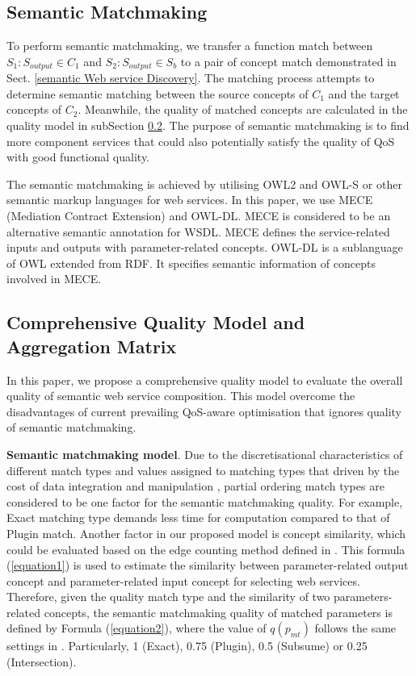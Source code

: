 \documentclass{llncs}
\begin{document}
\subsection{Semantic Matchmaking} \label{semantic_matchmaking}
To perform semantic matchmaking, we transfer a function match between $S_{1}: S_{output} \in C_{1}$ and $S_{2}:S_{output} \in S_{b}$ to a pair of concept match demonstrated in Sect. \ref{semantic Web service Discovery}. The matching process attempts to determine semantic matching between the source concepts of $C_{1}$ and the target concepts of $C_{2}$. Meanwhile, the quality of matched concepts are calculated in the quality model in subSection \ref{qualityModel}. The purpose of semantic matchmaking is to find more component services that could also potentially satisfy the quality of QoS with good functional quality.

The semantic matchmaking is achieved by utilising OWL2 and OWL-S or other semantic markup languages for web services. In this paper, we use MECE (Mediation Contract Extension) \cite{bleul2008self} and OWL-DL. MECE is considered to be an alternative semantic annotation for WSDL. MECE defines the service-related inputs and outputs with parameter-related concepts. OWL-DL is a sublanguage of OWL extended from RDF. It specifies semantic information of concepts involved in MECE. 
\vspace{-0.5cm}
\subsection{Comprehensive Quality Model and Aggregation Matrix}\label{qualityModel}
In this paper, we propose a comprehensive quality model to evaluate the overall quality of semantic web service composition. This model overcome the disadvantages of current prevailing QoS-aware optimisation \cite{bansal2016generalized,mier2015integrated,da2016particle,da2015graphevol,yu2013adaptive} that ignores quality of semantic matchmaking.

\textbf{Semantic matchmaking model}. Due to the discretisational characteristics of different match types and values assigned to matching types that driven by the cost of data integration and manipulation \cite{lecue2009optimizing}, partial ordering match types are considered to be one factor for the semantic matchmaking quality. For example, Exact matching type demands less time for computation compared to that of Plugin match. Another factor in our proposed model is concept similarity, which could be evaluated based on the edge counting method defined in \cite{shet2012new}. This formula (\ref{equation1}) is used to estimate the similarity between parameter-related output concept and parameter-related input concept for selecting web services. Therefore, given the quality match type and the similarity of two parameters-related concepts, the semantic matchmaking quality of matched parameters is defined by Formula (\ref{equation2}), where the value of $q(p_ {mt})$ follows the same settings in \cite{lecue2009optimizing}. Particularly, 1 (Exact), 0.75 (Plugin), 0.5 (Subsume) or 0.25 (Intersection). 
\end{document}
